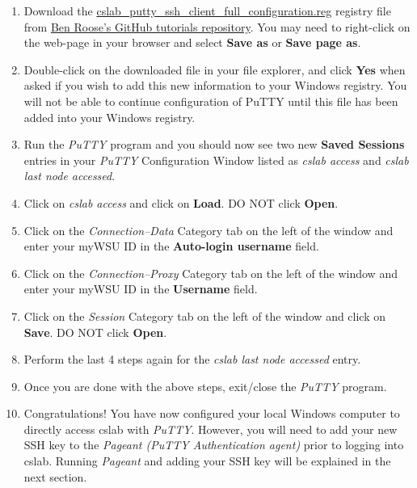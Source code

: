 \documentclass[12pt]{article}
\begin{document}
\begin{flushleft}
\begin{enumerate}
  \item Download the \href{https://raw.githubusercontent.com/benroose/tutorials/master/cslab_tutorials/cslab_ssh_client_config_files/cslab_putty_ssh_client_full_configuration.reg}{cslab\_putty\_ssh\_client\_full\_configuration.reg} registry file from \href{https://github.com/benroose/tutorials/tree/master/cslab_tutorials/}{Ben Roose's GitHub tutorials repository}. You may need to right-click on the web-page in your browser and select \textbf{Save as} or \textbf{Save page as}.
  \item Double-click on the downloaded file in your file explorer, and click \textbf{Yes} when asked if you wish to add this new information to your Windows registry. You will not be able to continue configuration of PuTTY until this file has been added into your Windows registry.
  \item Run the \textit{PuTTY} program and you should now see two new \textbf{Saved Sessions} entries in your \textit{PuTTY} Configuration Window listed as \textit{cslab access} and \textit{cslab last node accessed}.
  \item Click on \textit{cslab access} and click on \textbf{Load}. DO NOT click \textbf{Open}.
  \item Click on the \textit{Connection--Data} Category tab on the left of the window and enter your myWSU ID in the \textbf{Auto-login username} field.
  \item Click on the \textit{Connection--Proxy} Category tab on the left of the window and enter your myWSU ID in the \textbf{Username} field.
  \item Click on the \textit{Session} Category tab on the left of the window and click on \textbf{Save}. DO NOT click \textbf{Open}.
  \item Perform the last 4 steps again for the \textit{cslab last node accessed} entry.
  \item Once you are done with the above steps, exit/close the \textit{PuTTY} program.
  \item Congratulations! You have now configured your local Windows computer to directly access cslab with \textit{PuTTY}. However, you will need to add your new SSH key to the \textit{Pageant (PuTTY Authentication agent)} prior to logging into cslab. Running \textit{Pageant} and adding your SSH key will be explained in the next section.
\end{enumerate}


\end{flushleft}
\end{document}
